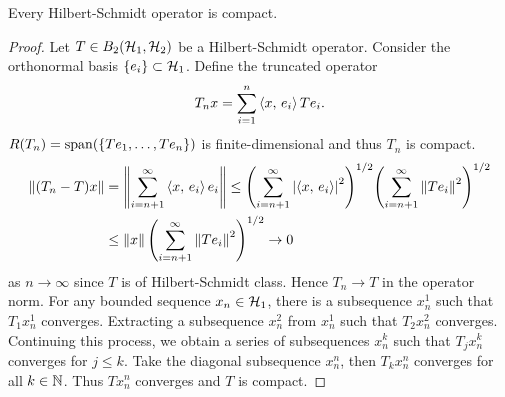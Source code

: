 \begin{theorem}
    Every Hilbert-Schmidt operator is compact.
\end{theorem}
\begin{proof}
    Let $T\in B_2(\mathcal{H}_1,\mathcal{H}_2)$ be a Hilbert-Schmidt operator. Consider 
    the orthonormal basis $\left\{ {e_i} \right\}\subset\mathcal{H}_1$. Define the truncated 
    operator 
    \begin{equation*}
        T_nx = \sum_{i=1}^{n}\left\langle {x},\, {e_i} \right\rangle Te_i.
    \end{equation*}
    $R(T_n) = \operatorname{span}(\left\{ {Te_1,\ldots,Te_n} \right\})$ is finite-dimensional and 
    thus $T_n$ is compact. 
    \begin{equation*}
        \begin{split}
            \norm{(T_n-T)x} &= \norm{\sum_{i=n+1}^\infty \inp{x}{e_i}e_i}
            \leq \pth{\sum_{i=n+1}^\infty \abs{\inp{x}{e_i}}^2}^{1/2}\pth{\sum_{i=n+1}^\infty \norm{Te_i}^2}^{1/2} \\
            &\leq \norm{x}\pth{\sum_{i=n+1}^\infty \norm{Te_i}^2}^{1/2}\to 0
        \end{split}
    \end{equation*}
    as $n\to\infty$ since $T$ is of Hilbert-Schmidt class. 
    Hence $T_n\to T$ in the operator norm. For any bounded sequence 
    $x_n\in\mathcal{H}_1$, there is a subsequence $x_n^1$ such that $T_1x_n^1$ 
    converges. Extracting a subsequence $x_n^2$ from $x_n^1$ such that 
    $T_2x_n^2$ converges. Continuing this process, we obtain a 
    series of subsequences $x_n^k$ such that $T_jx_n^k$ converges 
    for $j\leq k$. Take the diagonal subsequence $x_n^n$, then 
    $T_kx_n^n$ converges for all $k\in\mathbb{N}$. Thus $Tx_n^n$ converges 
    and $T$ is compact.
\end{proof}

